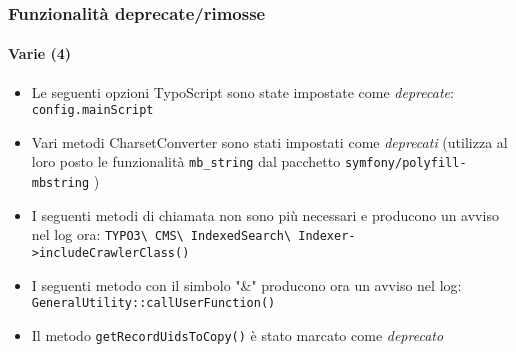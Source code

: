 \begin{frame}[fragile]
	\frametitle{Funzionalità deprecate/rimosse}
	\framesubtitle{Varie (4)}


	\begin{itemize}

		\item Le seguenti opzioni TypoScript sono state impostate come \textit{deprecate}:\newline
			\texttt{config.mainScript}

		\item Vari metodi CharsetConverter sono stati impostati come \textit{deprecati}\newline
			\small
				(utilizza al loro posto le funzionalità \texttt{mb\_string} dal pacchetto \texttt{symfony/polyfill-mbstring}
				)
			\normalsize

		\item I seguenti metodi di chiamata non sono più necessari e producono un avviso nel log ora:
			\small\texttt{TYPO3\textbackslash
				CMS\textbackslash
				IndexedSearch\textbackslash
				Indexer->includeCrawlerClass()}
			\normalsize

		\item I seguenti metodo con il simbolo "\&" producono ora un avviso nel log:
			\small\texttt{GeneralUtility::callUserFunction()}\normalsize

		\item Il metodo \texttt{getRecordUidsToCopy()} è stato marcato come \textit{deprecato}

	\end{itemize}

\end{frame}









